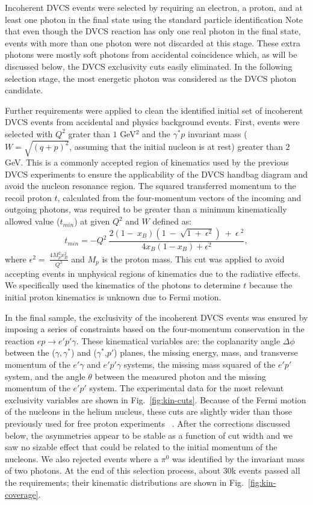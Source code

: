 \documentclass[twocolumn,nofootinbib,prl,superscriptaddress,secnumarabic,amssymb,nobibnotes,aps,floatfix]{revtex4}
\begin{document}
Incoherent DVCS events were selected by requiring an electron, a proton, and at 
least one photon in the final state using the standard particle identification 
Note that even though the DVCS reaction has only one real photon in the final 
state, events with more than one photon were not discarded at this stage. These 
extra photons were mostly soft photons from accidental coincidence which, as 
will be discussed below, the DVCS exclusivity cuts easily eliminated.  In the 
following selection stage, the most energetic photon was considered as the DVCS 
photon candidate.

Further requirements were applied to clean the identified initial set of 
incoherent DVCS events from accidental and physics background events. 
First, events were selected with $Q^2$ grater than $1$ GeV$^2$ and the 
$\gamma^*p$ invariant mass ($W=\sqrt{(q+p)^2}$, assuming that the initial 
nucleon is at rest) greater than $2$ GeV. This is a commonly accepted region of 
kinematics used by the previous DVCS experiments to ensure the applicability of 
the DVCS handbag diagram and avoid the nucleon resonance region. The squared 
transferred momentum to the recoil proton $t$, calculated from the 
four-momentum vectors of the incoming and outgoing photons, was required to be 
greater than a minimum kinematically allowed value ($t_{min}$) at given $Q^2$ 
and $W$ defined as: \begin{equation}
t_{min} 
   =-Q^{2}~\frac{2(1-~x_{B})(1~-~\sqrt{1~+~\epsilon^{2}})~+~\epsilon~^{2}}{4x_{B}(1-x_{B})+\epsilon^{2}},
\end{equation}
where $\epsilon^{2}=~\frac{4M^{2}_{p}x^{2}_{B}}{Q^{2}}$ and $M_{p}$ is the 
proton mass. This cut was applied to avoid accepting events in unphysical 
regions of kinematics due to the radiative effects. We specifically used the 
kinematics of the photons to determine $t$ because the initial proton 
kinematics is unknown due to Fermi motion. 

In the final sample, the exclusivity of the incoherent DVCS events was ensured 
by imposing a series of constraints based on the four-momentum conservation in 
the reaction $ep\rightarrow e'p'\gamma$.  These kinematical variables are: the 
coplanarity angle $\Delta\phi$ between the ($\gamma,\gamma^*$) and 
($\gamma^*$,$p'$) planes, the missing energy, mass, and transverse momentum of 
the $e'\gamma$ and $e'p'\gamma$ systems, the missing mass squared of the $e'p'$ 
system, and the angle $\theta$ between the measured photon and the missing 
momentum of the $e'p'$ system. The experimental data for the most relevant 
exclusivity variables are shown in Fig.~\ref{fig:kin-cuts}.  Because of the 
Fermi motion of the nucleons in the helium nucleus, these cuts
are slightly wider than those previously used for free proton experiments~%
\cite{Girod:2007aa}. After the corrections discussed below, the asymmetries 
appear to be stable as a function of cut width and we saw no sizable effect 
that could be related to the initial momentum of the nucleons. We also rejected 
events where a $\pi^0$ was identified by the invariant mass of two photons. At 
the end of this selection process, about 30k events passed all the 
requirements; their kinematic distributions are shown in 
Fig.~\ref{fig:kin-coverage}.  
\end{document}
